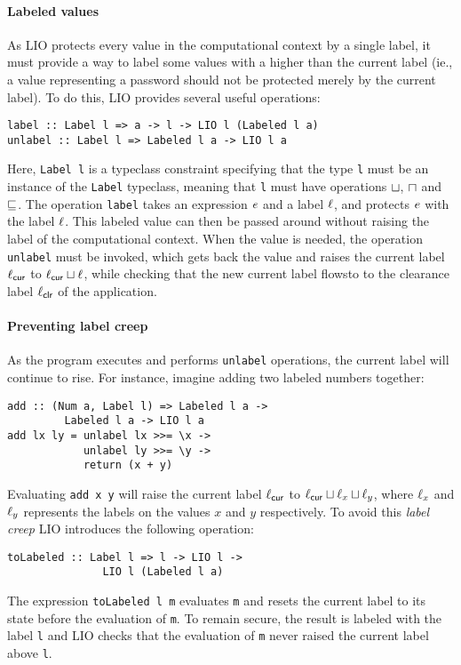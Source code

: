 \paragraph{Labeled values}
As LIO protects every value in the computational context by a single label, it must provide a way to label some values with a higher than the current label (ie., a value representing a password should not be protected merely by the current label). To do this, LIO provides several useful operations:
\begin{verbatim}
label :: Label l => a -> l -> LIO l (Labeled l a)
unlabel :: Label l => Labeled l a -> LIO l a
\end{verbatim}
Here, \texttt{Label l} is a typeclass constraint specifying that the type \texttt{l} must be an instance of the \texttt{Label} typeclass, meaning that \texttt{l} must have operations $\sqcup$, $\sqcap$ and $\sqsubseteq$. The operation \texttt{label} takes an expression $e$ and a label $\ell$, and protects $e$ with the label $\ell$. This labeled value can then be passed around without raising the label of the computational context. When the value is needed, the operation \texttt{unlabel} must be invoked, which gets back the value and raises the current label $\ell_{\mathsf{cur}}$ to $\ell_{\mathsf{cur}} \sqcup \ell$, while checking that the new current label flowsto to the clearance label $\ell_{\mathsf{clr}}$ of the application.

\paragraph{Preventing label creep}
As the program executes and performs \texttt{unlabel} operations, the current label will continue to rise. For instance, imagine adding two labeled numbers together:
\begin{verbatim}
add :: (Num a, Label l) => Labeled l a ->
         Labeled l a -> LIO l a
add lx ly = unlabel lx >>= \x ->
            unlabel ly >>= \y ->
            return (x + y)
\end{verbatim}
Evaluating \texttt{add x y} will raise the current label $\ell_{\mathsf{cur}}$ to $\ell_{\mathsf{cur}} \sqcup \ell_x \sqcup \ell_y$, where $\ell_x$ and $\ell_y$ represents the labels on the values $x$ and $y$ respectively. To avoid this \emph{label creep} LIO introduces the following operation:
\begin{verbatim}
toLabeled :: Label l => l -> LIO l ->
               LIO l (Labeled l a)
\end{verbatim}
The expression \texttt{toLabeled l m} evaluates \texttt{m} and resets the current label to its state before the evaluation of \texttt{m}. To remain secure, the result is labeled with the label \texttt{l} and LIO checks that the evaluation of \texttt{m} never raised the current label above \texttt{l}.